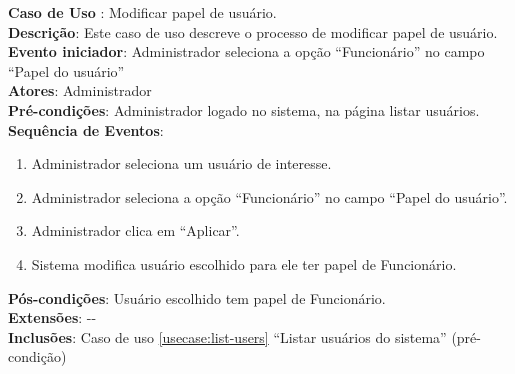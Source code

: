 \documentclass[]{politex}
\begin{document}
\noindent \textbf{Caso de Uso }: Modificar papel de
usuário. \\
\textbf{Descrição}: Este caso de uso descreve o processo de modificar papel de
usuário. \\
\textbf{Evento iniciador}: Administrador seleciona a opção ``Funcionário'' no
campo ``Papel do usuário'' \\
\textbf{Atores}: Administrador \\
\textbf{Pré-condições}: Administrador logado no sistema, na página listar
usuários. \\
\textbf{Sequência de Eventos}:
\begin{enumerate}
\item Administrador seleciona um usuário de interesse.
\item Administrador seleciona a opção ``Funcionário'' no campo ``Papel do
usuário''.
\item Administrador clica em ``Aplicar''.
\item Sistema modifica usuário escolhido para ele ter papel de Funcionário.
\end{enumerate}
\textbf{Pós-condições}: Usuário escolhido tem papel de Funcionário. \\
\textbf{Extensões}: -{}- \\
\textbf{Inclusões}: Caso de uso \ref{usecase:list-users} ``Listar usuários do
sistema'' (pré-condição) \\

\anexo
\end{document}
